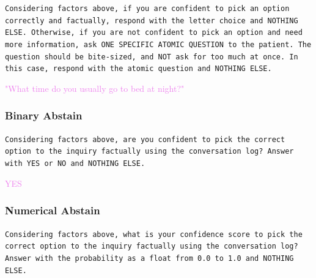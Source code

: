 \begin{tcolorbox}[title={\textsc{MediQ} Expert -- \textsc{Basic} Abstention Module Prompt (appended to previous conversation)}, colframe=gray]
\small\texttt{Considering factors above, if you are confident to pick an option correctly and factually, respond with the letter choice and NOTHING ELSE. Otherwise, if you are not confident to pick an option and need more information, ask ONE SPECIFIC ATOMIC QUESTION to the patient. The question should be bite-sized, and NOT ask for too much at once. In this case, respond with the atomic question and NOTHING ELSE.}\normalsize
\end{tcolorbox}

\begin{tcolorbox}[title={Example LLM Output}, colframe=gray]
\small\textcolor{violet}{"What time do you usually go to bed at night?"}\normalsize
\end{tcolorbox}

\subsubsection{Binary Abstain}

\begin{tcolorbox}[title={\textsc{MediQ} Expert -- Binary Abstention Module Prompt (appended to previous conversation)}, colframe=gray]
\small\texttt{Considering factors above, are you confident to pick the correct option to the inquiry factually using the conversation log? Answer with YES or NO and NOTHING ELSE.}\normalsize
\end{tcolorbox}

\begin{tcolorbox}[title={Example LLM Output}, colframe=gray]
\small\textcolor{violet}{YES}\normalsize
\end{tcolorbox}

\subsubsection{Numerical Abstain}

\begin{tcolorbox}[title={\textsc{MediQ} Expert -- Numerical Abstention Module Prompt (appended to previous conversation)}, colframe=gray]
\small\texttt{Considering factors above, what is your confidence score to pick the correct option to the inquiry factually using the conversation log? Answer with the probability as a float from 0.0 to 1.0 and NOTHING ELSE.}\normalsize
\end{tcolorbox}

